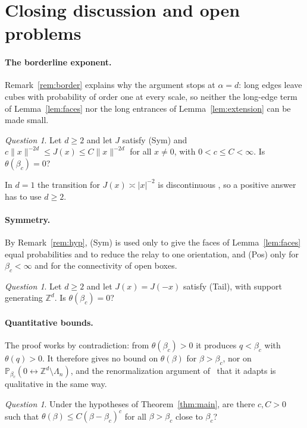 \documentclass[11pt]{article}
\theoremstyle{definition}
\theoremstyle{remark}
\newtheorem{question}[theorem]{Question}
\numberwithin{equation}{section}
\newcommand{\Z}{\mathbb Z}
\newcommand{\Pp}{\mathbb P}
\newcommand{\1}{\mathbf 1}
\newcommand{\lr}{\leftrightarrow}
\newcommand{\Lam}{\Lambda}
\newcommand{\norm}[1]{\|#1\|}
\begin{document}
\section{Closing discussion and open problems}\label{sec:open}

\paragraph{The borderline exponent.} Remark~\ref{rem:border} explains why the argument stops at
$\alpha=d$: long edges leave cubes with probability of order one at every scale, so neither the
long-edge term of Lemma~\ref{lem:faces} nor the long entrances of Lemma~\ref{lem:extension} can be
made small.
\begin{question}\label{q:border}
Let $d\ge2$ and let $J$ satisfy \textup{(Sym)} and $c\norm{x}^{-2d}\le J(x)\le C\norm{x}^{-2d}$ for
all $x\ne0$, with $0<c\le C<\infty$. Is $\theta(\beta_c)=0$?
\end{question}
In $d=1$ the transition for $J(x)\asymp|x|^{-2}$ is discontinuous
\cite{AizenmanNewman1986,DuminilCopinGarbanTassion2020}, so a positive answer has to use $d\ge2$.

\paragraph{Symmetry.} By Remark~\ref{rem:hyp}, (Sym) is used only to give the faces of
Lemma~\ref{lem:faces} equal probabilities and to reduce the relay to one orientation, and (Pos) only
for $\beta_c<\infty$ and for the connectivity of open boxes.
\begin{question}\label{q:sym}
Let $d\ge2$ and let $J(x)=J(-x)$ satisfy \textup{(Tail)}, with support generating $\Z^d$. Is
$\theta(\beta_c)=0$?
\end{question}

\paragraph{Quantitative bounds.} The proof works by contradiction: from $\theta(\beta_c)>0$ it
produces $q<\beta_c$ with $\theta(q)>0$. It therefore gives no bound on $\theta(\beta)$ for
$\beta>\beta_c$, nor on $\Pp_{\beta_c}(0\lr\Z^d\setminus\Lam_n)$, and the renormalization argument
of~\cite{OpenAIZ3} that it adapts is qualitative in the same way.
\begin{question}\label{q:rate}
Under the hypotheses of Theorem~\ref{thm:main}, are there $c,C>0$ such that
$\theta(\beta)\le C(\beta-\beta_c)^c$ for all $\beta>\beta_c$ close to $\beta_c$?
\end{question}
\end{document}
